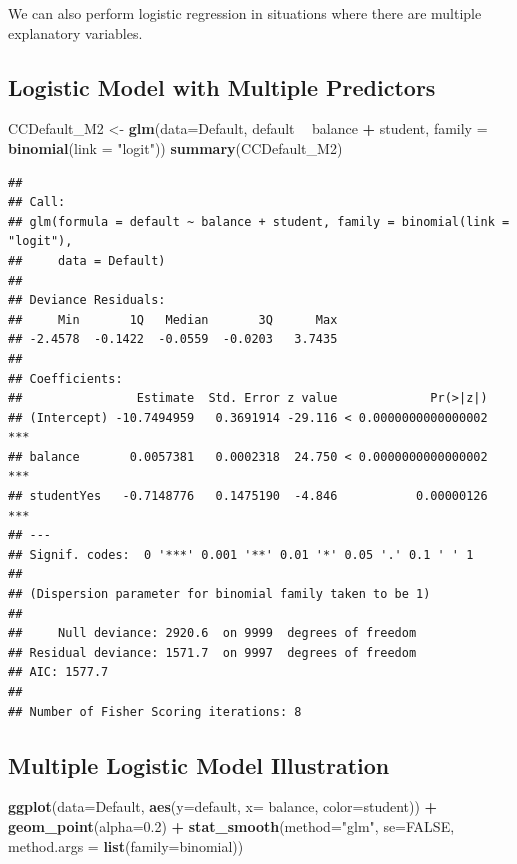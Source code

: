 \documentclass[]{book}
\newenvironment{Shaded}{\begin{snugshade}}{\end{snugshade}}
\newcommand{\KeywordTok}[1]{\textcolor[rgb]{0.13,0.29,0.53}{\textbf{#1}}}
\newcommand{\DataTypeTok}[1]{\textcolor[rgb]{0.13,0.29,0.53}{#1}}
\newcommand{\FloatTok}[1]{\textcolor[rgb]{0.00,0.00,0.81}{#1}}
\newcommand{\StringTok}[1]{\textcolor[rgb]{0.31,0.60,0.02}{#1}}
\newcommand{\OtherTok}[1]{\textcolor[rgb]{0.56,0.35,0.01}{#1}}
\newcommand{\OperatorTok}[1]{\textcolor[rgb]{0.81,0.36,0.00}{\textbf{#1}}}
\newcommand{\NormalTok}[1]{#1}
\begin{document}
We can also perform logistic regression in situations where there are
multiple explanatory variables.

\subsection{Logistic Model with Multiple
Predictors}\label{logistic-model-with-multiple-predictors}

\begin{Shaded}
\begin{Highlighting}[]
\NormalTok{CCDefault_M2 <-}\StringTok{ }\KeywordTok{glm}\NormalTok{(}\DataTypeTok{data=}\NormalTok{Default, default }\OperatorTok{~}\StringTok{ }\NormalTok{balance }\OperatorTok{+}\StringTok{ }\NormalTok{student, }\DataTypeTok{family =} \KeywordTok{binomial}\NormalTok{(}\DataTypeTok{link =} \StringTok{"logit"}\NormalTok{))}
\KeywordTok{summary}\NormalTok{(CCDefault_M2)}
\end{Highlighting}
\end{Shaded}

\begin{verbatim}
## 
## Call:
## glm(formula = default ~ balance + student, family = binomial(link = "logit"), 
##     data = Default)
## 
## Deviance Residuals: 
##     Min       1Q   Median       3Q      Max  
## -2.4578  -0.1422  -0.0559  -0.0203   3.7435  
## 
## Coefficients:
##                Estimate  Std. Error z value             Pr(>|z|)    
## (Intercept) -10.7494959   0.3691914 -29.116 < 0.0000000000000002 ***
## balance       0.0057381   0.0002318  24.750 < 0.0000000000000002 ***
## studentYes   -0.7148776   0.1475190  -4.846           0.00000126 ***
## ---
## Signif. codes:  0 '***' 0.001 '**' 0.01 '*' 0.05 '.' 0.1 ' ' 1
## 
## (Dispersion parameter for binomial family taken to be 1)
## 
##     Null deviance: 2920.6  on 9999  degrees of freedom
## Residual deviance: 1571.7  on 9997  degrees of freedom
## AIC: 1577.7
## 
## Number of Fisher Scoring iterations: 8
\end{verbatim}

\subsection{Multiple Logistic Model
Illustration}\label{multiple-logistic-model-illustration}

\begin{Shaded}
\begin{Highlighting}[]
\KeywordTok{ggplot}\NormalTok{(}\DataTypeTok{data=}\NormalTok{Default, }\KeywordTok{aes}\NormalTok{(}\DataTypeTok{y=}\NormalTok{default, }\DataTypeTok{x=}\NormalTok{ balance, }\DataTypeTok{color=}\NormalTok{student)) }\OperatorTok{+}\StringTok{ }\KeywordTok{geom_point}\NormalTok{(}\DataTypeTok{alpha=}\FloatTok{0.2}\NormalTok{) }\OperatorTok{+}\StringTok{ }\KeywordTok{stat_smooth}\NormalTok{(}\DataTypeTok{method=}\StringTok{"glm"}\NormalTok{, }\DataTypeTok{se=}\OtherTok{FALSE}\NormalTok{, }\DataTypeTok{method.args =} \KeywordTok{list}\NormalTok{(}\DataTypeTok{family=}\NormalTok{binomial)) }
\end{Highlighting}
\end{Shaded}
\end{document}
